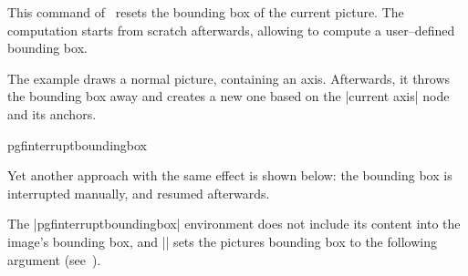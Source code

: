 \begin{command}{\pgfresetboundingbox}
	This command of \pgfname\ resets the bounding box of the current picture. The computation starts from scratch afterwards, allowing to compute a user--defined bounding box.
	
\begin{codeexample}[]
\setlength{\fboxsep}{0pt}%
%
\end{codeexample}%
	The example draws a normal picture, containing an axis. Afterwards, it throws the bounding box away and creates a new one based on the |current axis| node and its anchors.
\end{command}

\begin{environment}{{pgfinterruptboundingbox}}
\label{sec:bounding:box:example}%
{%
%
	Yet another approach with the same effect is shown below: the bounding box is interrupted manually, and resumed afterwards.
\begin{codeexample}[]
\setlength{\fboxsep}{0pt}%
%
\end{codeexample}%
}%
The |pgfinterruptboundingbox| environment does not include its content into the image's bounding box, and |\useasboundingbox| sets the pictures bounding box to the following argument (see~\cite{tikz}).
\end{environment}

